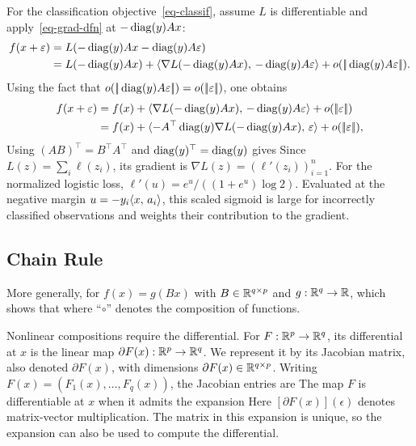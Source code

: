 For the classification objective~\eqref{eq-classif}, assume $L$ is differentiable and apply~\eqref{eq-grad-dfn} at $-\operatorname{diag}(y) Ax$:
\begin{align*}
	f(x+\varepsilon) &= L( -\operatorname{diag}(y) Ax -\operatorname{diag}(y)  A\varepsilon) \\
	&= L(-\operatorname{diag}(y) Ax) + \langle \nabla L( -\operatorname{diag}(y) Ax),\, -\operatorname{diag}(y)  A\varepsilon \rangle + o(|\!| \operatorname{diag}(y)  A\varepsilon |\!|).
\end{align*} 
Using the fact that $o(|\!| \operatorname{diag}(y)  A\varepsilon |\!|) = o(|\!| \varepsilon |\!|)$, one obtains
\begin{align*}
	f(x+\varepsilon) &= f(x) + \langle \nabla L( -\operatorname{diag}(y) Ax),\,-\operatorname{diag}(y)  A\varepsilon\rangle + o(|\!| \varepsilon |\!|) \\
		 &=  f(x) + \langle -A^\top \operatorname{diag}(y) \nabla L( -\operatorname{diag}(y) Ax),\,\varepsilon\rangle + o(|\!| \varepsilon |\!|), 
\end{align*} 	
Using $(AB)^\top = B^\top A^\top$ and $\operatorname{diag}(y)^\top=\operatorname{diag}(y)$ gives
Since $L(z)=\sum_i\ell(z_i)$, its gradient is $\nabla L(z)=(\ell'(z_i))_{i=1}^n$. For the normalized logistic loss, $\ell'(u)=e^u/((1+e^u)\log 2)$. Evaluated at the negative margin $u=-y_i\langle x,\,a_i\rangle$, this scaled sigmoid is large for incorrectly classified observations and weights their contribution to the gradient.


\subsection{Chain Rule}

More generally, for $f(x) = g(Bx)$ with $B \in \mathbb{R}^{q \times p}$ and $g : \mathbb{R}^q \rightarrow \mathbb{R}$,
which shows that 
where ``$\circ$'' denotes the composition of functions.

Nonlinear compositions require the differential. For $F : \mathbb{R}^p \rightarrow \mathbb{R}^q$, its differential at $x$ is the linear map $\partial F(x) : \mathbb{R}^{p} \rightarrow \mathbb{R}^q$. We represent it by its Jacobian matrix, also denoted $\partial F(x)$, with dimensions $\partial F(x) \in \mathbb{R}^{q \times p}$.
%
Writing $F(x)=(F_1(x), \ldots, F_q(x))$, the Jacobian entries are
The map $F$ is differentiable at $x$ when it admits the expansion
Here $[\partial F(x)](\epsilon)$ denotes matrix-vector multiplication. The matrix in this expansion is unique, so the expansion can also be used to compute the differential.

